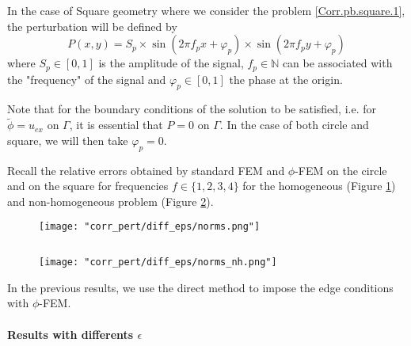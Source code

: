 In the case of Square geometry where we consider the problem \ref{Corr.pb.square.1}, the perturbation will be defined by
\begin{equation*}
	P(x,y)=S_p\times\sin\left(2\pi f_px+\varphi_p\right)\times\sin\left(2\pi f_py+\varphi_p\right)
\end{equation*}
where $S_p\in[0,1]$ is the amplitude of the signal, $f_p\in\mathbb{N}$ can be associated with the "frequency" of the signal and $\varphi_p\in[0,1]$ the phase at the origin.

\begin{Rem}
	Note that for the boundary conditions of the solution to be satisfied, i.e. for $\tilde{\phi}=u_{ex}$ on $\Gamma$, it is essential that $P=0$ on $\Gamma$. In the case of both circle and square, we will then take $\varphi_p=0$.
\end{Rem}

Recall the relative errors obtained by standard FEM and $\phi$-FEM on the circle and on the square for frequencies $f\in\{1,2,3,4\}$ for the homogeneous  (Figure \ref{norms}) and non-homogeneous problem  (Figure \ref{norms_nh}).

\begin{minipage}{0.48\linewidth}
	\begin{figure}[H]
		\centering
		\texttt{[image: "corr\_pert/diff\_eps/norms.png"]}
		\label{norms}
	\end{figure} 
\end{minipage} $\qquad$
\begin{minipage}{0.48\linewidth}
	\begin{figure}[H]
		\centering
		\texttt{[image: "corr\_pert/diff\_eps/norms\_nh.png"]}
		\label{norms_nh}
	\end{figure} 
\end{minipage}

\begin{Rem}
	In the previous results, we use the direct method to impose the edge conditions with $\phi$-FEM.
\end{Rem}

\paragraph{Results with differents $\epsilon$} \label{Corr.results.disturbed.eps} 

